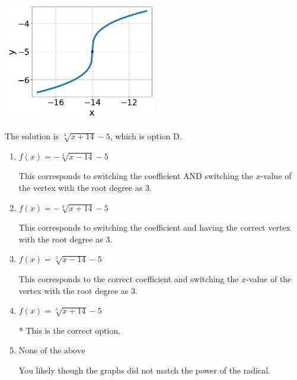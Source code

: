 \documentclass{extbook}[14pt]
\begin{document}
\begin{enumerate}
{\begin{center}
    \includegraphics[width=0.5\textwidth]{../Figures/radicalGraphToEquationC.png}
\end{center}


The solution is \( \sqrt[3]{x + 14} - 5 \), which is option D.\begin{enumerate}[label=\Alph*.]
\item \( f(x) = - \sqrt[3]{x - 14} - 5 \)

This corresponds to switching the coefficient AND switching the $x$-value of the vertex with the root degree as $3$.
\item \( f(x) = - \sqrt[3]{x + 14} - 5 \)

This corresponds to switching the coefficient and having the correct vertex with the root degree as $3$.
\item \( f(x) = \sqrt[3]{x - 14} - 5 \)

This corresponds to the correct coefficient and switching the $x$-value of the vertex with the root degree as $3$.
\item \( f(x) = \sqrt[3]{x + 14} - 5 \)

* This is the correct option.
\item \( \text{None of the above} \)

You likely though the graphs did not match the power of the radical.
\end{enumerate}

}
\end{enumerate}
\end{document}
